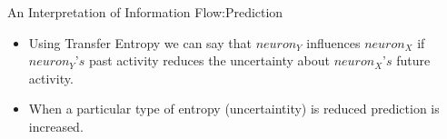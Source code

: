 \documentclass{beamer}
\begin{document}
\begin{frame}{An Interpretation of Information Flow:Prediction}
\begin{itemize}


\item \vfill Using Transfer Entropy we can say that $neuron_{Y}$ influences $neuron_{X}$ if $neuron_{Y}$'$s$ past activity reduces the uncertainty about $neuron_{X}$'$s$ future activity. 
\begin{figure}


\centering 


\end{figure}
\item \vfill When a particular type of entropy (uncertaintity) is reduced prediction is increased.
\end{itemize}


\end{frame}
\end{document}
